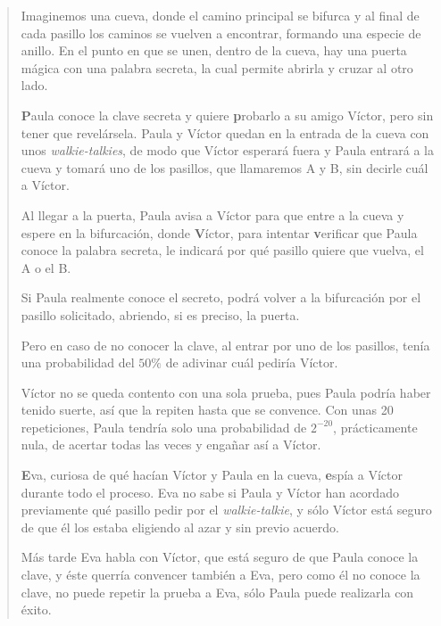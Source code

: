 \begin{quote}
Imaginemos una cueva, donde el camino principal se bifurca y al final de cada pasillo los caminos se vuelven a encontrar, formando una especie de anillo. En el punto en que se unen, dentro de la cueva, hay una puerta mágica con una palabra secreta, la cual permite abrirla y cruzar al otro lado.

\textbf{P}aula conoce la clave secreta y quiere \textbf{p}robarlo a su amigo Víctor, pero sin tener que revelársela. Paula y Víctor quedan en la entrada de la cueva con unos \textit{walkie-talkies}, de modo que Víctor esperará fuera y Paula entrará a la cueva y tomará uno de los pasillos, que llamaremos A y B, sin decirle cuál a Víctor.


Al llegar a la puerta, Paula avisa a Víctor para que entre a la cueva y espere en la bifurcación, donde \textbf{V}íctor, para intentar \textbf{v}erificar que Paula conoce la palabra secreta, le indicará por qué pasillo quiere que vuelva, el A o el B.


Si Paula realmente conoce el secreto, podrá volver a la bifurcación por el pasillo solicitado, abriendo, si es preciso, la puerta.

Pero en caso de no conocer la clave, al entrar por uno de los pasillos, tenía una probabilidad del $50\%$ de adivinar cuál pediría Víctor.

Víctor no se queda contento con una sola prueba, pues Paula podría haber tenido suerte, así que la repiten hasta que se convence. Con unas 20 repeticiones, Paula tendría solo una probabilidad de $2^{-20}$, prácticamente nula, de acertar todas las veces y engañar así a Víctor.

\textbf{E}va, curiosa de qué hacían Víctor y Paula en la cueva, \textbf{e}spía a Víctor durante todo el proceso. Eva no sabe si Paula y Víctor han acordado previamente qué pasillo pedir por el \textit{walkie-talkie}, y sólo Víctor está seguro de que él los estaba eligiendo al azar y sin previo acuerdo.%

Más tarde Eva habla con Víctor, que está seguro de que Paula conoce la clave, y éste querría convencer también a Eva, pero como él no conoce la clave, no puede repetir la prueba a Eva, sólo Paula puede realizarla con éxito.
\end{quote}



